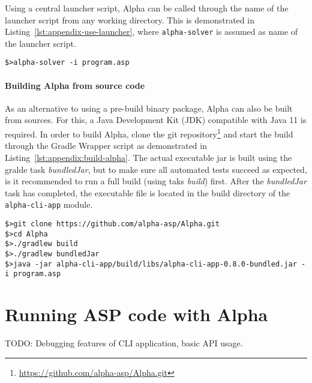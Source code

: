 Using a central launcher script, Alpha can be called through the name of the launcher script from any working directory. This is demonstrated in Listing~\ref{lst:appendix-use-launcher}, where \texttt{alpha-solver} is assumed as name of the launcher script.
\begin{lstlisting}[style=code, label={lst:appendix-use-launcher}, caption={Solving an ASP program using Alpha through a launcher script.}]
$>alpha-solver -i program.asp
\end{lstlisting}

\paragraph{Building Alpha from source code}
As an alternative to using a pre-build binary package, Alpha can also be built from sources. For this, a Java Development Kit (JDK) compatible with Java 11 is required. In order to build Alpha, clone the git repository\footnote{\url{https://github.com/alpha-asp/Alpha.git}} and start the build through the Gradle Wrapper script as demonstrated in Listing~\ref{lst:appendix:build-alpha}. The actual executable jar is built using the gralde task \emph{bundledJar}, but to make sure all automated tests succeed as expected, is it recommended to run a full build (using taks \emph{build}) first. After the \emph{bundledJar} task has completed, the executable file is located in the build directory of the \texttt{alpha-cli-app} module.
\begin{lstlisting}[style=code, label={lst:appendix-build-alpha}, caption={Building Alpha from source code.}]
$>git clone https://github.com/alpha-asp/Alpha.git
$>cd Alpha
$>./gradlew build
$>./gradlew bundledJar
$>java -jar alpha-cli-app/build/libs/alpha-cli-app-0.8.0-bundled.jar -i program.asp
\end{lstlisting}	

\section{Running ASP code with Alpha}

TODO: Debugging features of CLI application, basic API usage.

